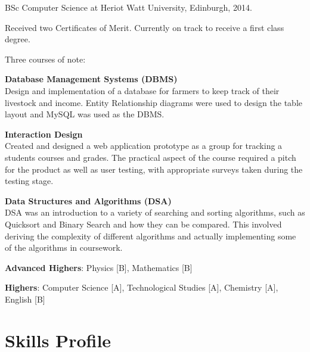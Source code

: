 \documentclass[11pt,a4paper]{article}
\renewenvironment{itemize}{
  \begin{list}{}{
    \setlength{\leftmargin}{1em}
    \setlength{\itemsep}{0.25em}
    \setlength{\parskip}{0pt}
    \setlength{\parsep}{0.25em}
    \renewcommand{\labelitemi}{$\bullet$}
  }
}{
  \end{list}
}
\begin{document}
\begin{itemize}
  \item BSc Computer Science at Heriot Watt University, Edinburgh, 2014.

    Received two Certificates of Merit. Currently on track to receive a first class degree.

    Three courses of note:
    \begin{itemize}
        \item \textbf{Database Management Systems (DBMS)} \\
            Design and implementation of a database for farmers to keep track of their livestock and income.
            Entity Relationship diagrams were used to design the table layout and MySQL was used as the DBMS.
        \item \textbf{Interaction Design} \\
            Created and designed a web application prototype as a group for tracking a students courses and grades. 
            The practical aspect of the course required a pitch for the product as well as user testing, with appropriate
            surveys taken during the testing stage.
        \item \textbf{Data Structures and Algorithms (DSA)} \\
            DSA was an introduction to a variety of searching and sorting algorithms, such as Quicksort and Binary Search and how they can be compared.
            This involved deriving the complexity of different algorithms and actually implementing some of
            the algorithms in coursework.
    \end{itemize}


    \begin{itemize}
        \item \textbf{Advanced Highers}: Physics [B], Mathematics [B]
        \item \textbf{Highers}: Computer Science [A], Technological Studies [A], Chemistry [A], English [B]
    \end{itemize}
\end{itemize}

\section*{Skills Profile}
\end{document}
